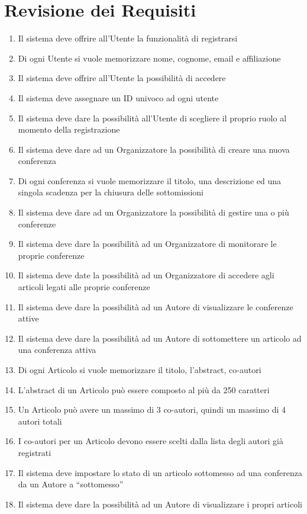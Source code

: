 \section{Revisione dei Requisiti}
\label{sec:revisione_requisiti}

\begin{enumerate}
\item Il sistema deve offrire all'Utente la funzionalità di registrarsi
\item Di ogni Utente si vuole memorizzare nome, cognome, email e affiliazione
\item Il sistema deve offrire all'Utente la possibilità di accedere
\item Il sistema deve assegnare un ID univoco ad ogni utente
\item Il sistema deve dare la possibilità all'Utente di scegliere il proprio ruolo al momento della registrazione
\item Il sistema deve dare ad un Organizzatore la possibilità di creare una nuova conferenza
\item Di ogni conferenza si vuole memorizzare il titolo, una descrizione ed una singola scadenza
  per la chiusura delle sottomissioni
\item Il sistema deve dare ad un Organizzatore la possibilità di gestire una o più conferenze
\item Il sistema deve dare la possibilità ad un Organizzatore di monitorare le proprie conferenze
\item Il sistema deve date la possibilità ad un Organizzatore di accedere agli articoli legati alle proprie conferenze
\item Il sistema deve dare la possibilità ad un Autore di visualizzare le conferenze attive
\item Il sistema deve dare la possibilità ad un Autore di sottomettere un articolo ad una conferenza attiva
\item Di ogni Articolo si vuole memorizzare il titolo, l'abstract, co-autori
\item L'abstract di un Articolo può essere composto al più da 250 caratteri
\item Un Articolo può avere un massimo di 3 co-autori, quindi un massimo di 4 autori totali
\item I co-autori per un Articolo devono essere scelti dalla lista degli autori già registrati
\item Il sistema deve impostare lo stato di un articolo sottomesso ad una conferenza da un Autore a ``sottomesso''
\item Il sistema deve dare la possibilità ad un Autore di visualizzare i propri articoli

\end{enumerate}
